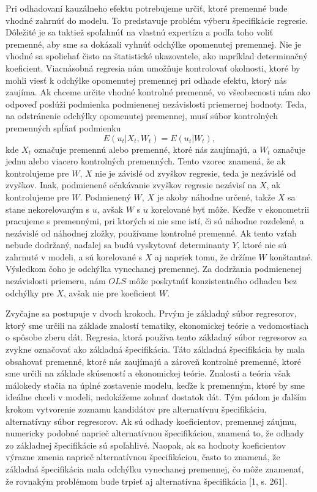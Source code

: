 \documentclass[]{tukediphc}
\begin{document}
Pri odhadovaní kauzálneho efektu potrebujeme určiť, ktoré premenné bude vhodné zahrnúť do modelu. To predstavuje problém výberu špecifikácie regresie. Dôležité je sa taktiež spoľahnúť na vlastnú expertízu a podľa toho voliť premenné, aby sme sa dokázali vyhnúť odchýlke opomenutej premennej. Nie je vhodné sa spoliehať čisto na štatistické ukazovatele, ako napríklad determinačný koeficient.
Viacnásobná regresia nám umožňuje kontrolovať okolnosti, ktoré by mohli viesť k odchýlke opomenutej premennej pri odhade efektu, ktorý nás zaujíma.
Ak chceme určite vhodné kontrolné premenné, vo všeobecnosti nám ako odpoveď poslúži podmienka podmienenej nezávislosti priemernej hodnoty. Teda, na odstránenie odchýlky opomenutej premennej, musí súbor kontrolných premenných spĺňať podmienku
\begin{equation}
    E(u_{t}|X_{t},W_{t}) = E(u_{t}|W_{t}),
\end{equation}
kde $X_{t}$ označuje premennú alebo premenné, ktoré nás zaujímajú, a $W_{t}$ označuje jednu alebo viacero kontrolných premenných.
Tento vzorec znamená, že ak kontrolujeme pre $W$, $X$ nie je závislé od zvyškov regresie, teda je nezávislé od zvyškov. Inak, podmienené očakávanie zvyškov regresie nezávisí na $X$, ak kontrolujeme pre $W$. Podmienený $W$, $X$ je akoby náhodne určené, takže $X$ sa stane nekorelovaným s $u$, avšak $W$ s $u$ korelované byť môže. Keďže v ekonometrii pracujeme s premennými, pri ktorých si nie sme istí, či sú náhodne rozdelené, a nezávislé od náhodnej zložky, používame kontrolné premenné. Ak tento vzťah nebude dodržaný, naďalej sa budú vyskytovať determinanty $Y$, ktoré nie sú zahrnuté v modeli, a sú korelované s $X$ aj napriek tomu, že držíme $W$ konštantné. Výsledkom čoho je odchýlka vynechanej premennej. Za dodržania podmienenej nezávislosti priemeru, nám $OLS$ môže poskytnúť konzistentného odhadcu bez odchýlky pre $X$, avšak nie pre koeficient $W$. 

Zvyčajne sa postupuje v dvoch krokoch. Prvým je základný súbor regresorov, ktorý sme určili na základe znalostí tematiky, ekonomickej teórie a vedomostiach o spôsobe zberu dát. Regresia, ktorá používa tento základný súbor regresorov sa zvykne označovať ako základná špecifikácia. Táto základná špecifikácia by mala obsahovať premenné, ktoré nás zaujímajú a zároveň kontrolné premenné, ktoré sme určili na základe skúseností a ekonomickej teórie. Znalosti a teória však málokedy stačia na úplné zostavenie modelu, keďže k premenným, ktoré by sme ideálne chceli v modeli, nedokážeme zohnať dostatok dát. Tým pádom je ďalším krokom vytvorenie zoznamu kandidátov pre alternatívnu špecifikáciu, alternatívny súbor regresorov. Ak sú odhady koeficientov, premennej záujmu, numericky podobné naprieč alternatívnou špecifikáciou, znamená to, že odhady zo základnej špecifikácie sú spoľahlivé. Naopak, ak sa hodnoty koeficientov výrazne zmenia naprieč alternatívnou špecifikáciou, často to znamená, že základná špecifikácia mala odchýlku vynechanej premennej, čo môže znamenať, že rovnakým problémom bude trpieť aj alternatívna špecifikácia [1, s. 261]. 
\end{document}
